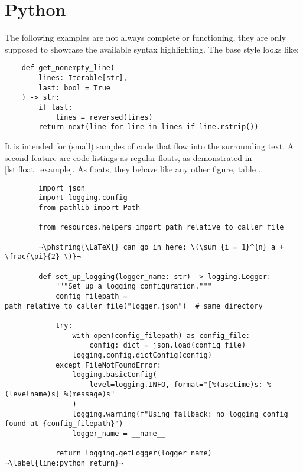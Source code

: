 \section{Python}
The following examples are not always complete or functioning, they are only supposed
to showcase the available syntax highlighting.
The base style looks like:
\begin{verbatim}
    def get_nonempty_line(
        lines: Iterable[str],
        last: bool = True
    ) -> str:
        if last:
            lines = reversed(lines)
        return next(line for line in lines if line.rstrip())
\end{verbatim}
It is intended for (small) samples of code that flow into the surrounding text.
A second feature are code listings as regular floats, as demonstrated in
\cref{lst:float_example}.
As floats, they behave like any other figure, table .

\begin{listing}
    \begin{verbatim}
        import json
        import logging.config
        from pathlib import Path

        from resources.helpers import path_relative_to_caller_file

        ¬\phstring{\LaTeX{} can go in here: \(\sum_{i = 1}^{n} a + \frac{\pi}{2} \)}¬

        def set_up_logging(logger_name: str) -> logging.Logger:
            """Set up a logging configuration."""
            config_filepath = path_relative_to_caller_file("logger.json")  # same directory

            try:
                with open(config_filepath) as config_file:
                    config: dict = json.load(config_file)
                logging.config.dictConfig(config)
            except FileNotFoundError:
                logging.basicConfig(
                    level=logging.INFO, format="[%(asctime)s: %(levelname)s] %(message)s"
                )
                logging.warning(f"Using fallback: no logging config found at {config_filepath}")
                logger_name = __name__

            return logging.getLogger(logger_name) ¬\label{line:python_return}¬
    \end{verbatim}
    \caption{%
        This is a caption.
        Listings cannot be overly long since floats do not page-break%
    }
    \label{lst:float_example}
\end{listing}

